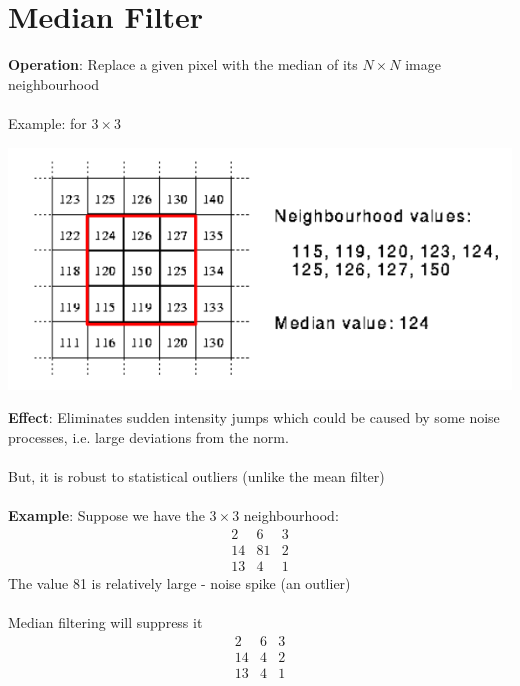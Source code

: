 \documentclass{article}[18pt]
\begin{document}
\section{Median Filter}
\textbf{Operation}: Replace a given pixel with the median of its $N\times N$ image neighbourhood\\
\\
Example: for $3\times 3$
\begin{center}
	\includegraphics[scale=0.7]{Median}
\end{center}
\textbf{Effect}: Eliminates sudden intensity jumps which could be caused by some noise processes, i.e. large deviations from the norm.\\
\\
But, it is robust to statistical outliers (unlike the mean filter)\\
\\
\textbf{Example}: Suppose we have the $3\times 3$ neighbourhood:
\[
\begin{array}{lll}{2} & {6} & {3} \\ {14} & {81} & {2} \\ {13} & {4} & {1}\end{array}
\]
The value 81 is relatively large - noise spike (an outlier)\\
\\
Median filtering will suppress it
\[
\begin{array}{lll}{2} & {6} & {3} \\ {14} & {4} & {2} \\ {13} & {4} & {1}\end{array}
\]
\end{document}
